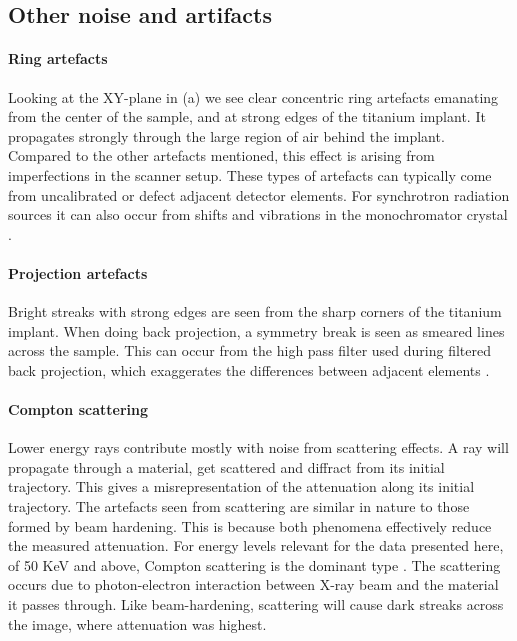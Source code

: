 \subsection{Other noise and artifacts}
\label{sec:noise-artefacts}

\paragraph{Ring artefacts} Looking at the XY-plane in (a) we see clear concentric ring
artefacts emanating from the center of the sample, and at strong edges of the titanium implant. It
propagates strongly through the large region of air behind the implant. Compared to the other
artefacts mentioned, this effect is arising from imperfections in the scanner setup. These types of
artefacts can typically come from uncalibrated or defect adjacent detector elements. For synchrotron
radiation sources it can also occur from shifts and vibrations in the monochromator crystal
\citep{ringartefacts}.

\paragraph{Projection artefacts} Bright streaks with strong edges are seen from the sharp corners of
the titanium implant. When doing back projection, a symmetry break is seen as smeared lines across
the sample. This can occur from the high pass filter used during filtered back projection, which
exaggerates the differences between adjacent elements \citep{ctnoise}.

\paragraph{Compton scattering} Lower energy rays contribute mostly with noise from scattering
effects. A ray will propagate through a material, get scattered and diffract from its initial
trajectory. This gives a misrepresentation of the attenuation along its initial trajectory. The
artefacts seen from scattering are similar in nature to those formed by beam hardening. This is
because both phenomena effectively reduce the measured attenuation. For energy levels relevant for
the data presented here, of 50 KeV and above, Compton scattering is the dominant type
\citep{Compton}.  The scattering occurs due to photon-electron interaction between X-ray beam and
the material it passes through. Like beam-hardening, scattering will cause dark streaks across the
image, where attenuation was highest.

